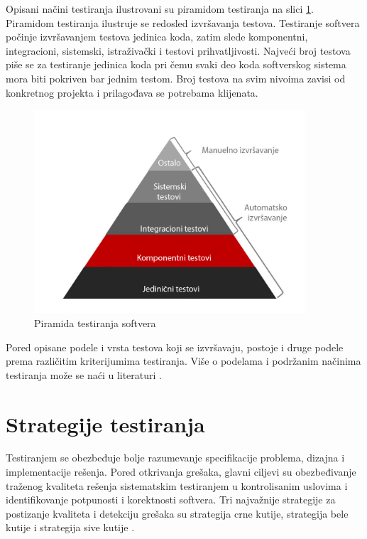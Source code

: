 \documentclass[12pt,oneside]{memoir}
\begin{document}
Opisani načini testiranja ilustrovani su piramidom testiranja na slici \ref{fig:piramida}. Piramidom testiranja ilustruje se redosled izvršavanja testova. Testiranje softvera počinje izvršavanjem testova jedinica koda, zatim slede komponentni, integracioni, sistemski, istraživački i testovi prihvatljivosti. Najveći broj testova piše se za testiranje jedinica koda pri čemu svaki deo koda softverskog sistema mora biti pokriven bar jednim testom. Broj testova na svim nivoima zavisi od konkretnog projekta i prilagođava se potrebama klijenata.
\begin{figure}[!ht]
  \centering
  \includegraphics[width=0.9\textwidth]{piramida.png}
  \caption{Piramida testiranja softvera}
  \label{fig:piramida}
\end{figure}


Pored opisane podele i vrsta testova koji se izvršavaju, postoje i druge podele prema različitim kriterijumima testiranja. Više o podelama i podržanim načinima testiranja može se naći u literaturi \cite{TestingProcess}.

\section{Strategije testiranja} \label{broj3}
Testiranjem se obezbeđuje bolje razumevanje specifikacije problema, dizajna i implementacije rešenja. Pored otkrivanja grešaka, glavni ciljevi su obezbeđivanje traženog kvaliteta rešenja sistematskim testiranjem u kontrolisanim uslovima i identifikovanje potpunosti i korektnosti softvera. Tri najvažnije strategije za postizanje kvaliteta i detekciju grešaka su 
strategija crne kutije, strategija bele kutije i strategija sive kutije \cite{Strategies}.
 
\end{document}
